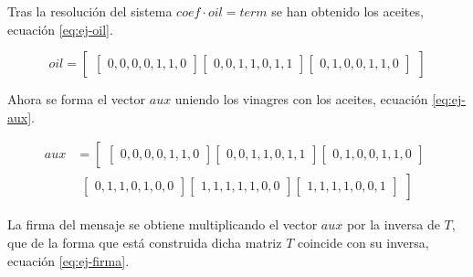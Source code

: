 Tras la resolución del sistema $coef \cdot oil = term$ se han obtenido los aceites, ecuación \ref{eq:ej-oil}.

\begin{equation}\label{eq:ej-oil}
	{oil} = 
		\left[\begin{array}{c}
			\left[\begin{array}{c}0, 0, 0, 0, 1, 1, 0\end{array}\right]			
			\left[\begin{array}{c}0, 0, 1, 1, 0, 1, 1\end{array}\right]
			\left[\begin{array}{c}0, 1, 0, 0, 1, 1, 0\end{array}\right]
		\end{array}\right]
\end{equation}

Ahora se forma el vector $aux$ uniendo los vinagres con los aceites, ecuación \ref{eq:ej-aux}.

\begin{equation}\label{eq:ej-aux}
	\begin{split}
	{aux} &= 
		\left[\begin{array}{c}
			\left[\begin{array}{c}0, 0, 0, 0, 1, 1, 0\end{array}\right]		
			\left[\begin{array}{c}0, 0, 1, 1, 0, 1, 1\end{array}\right]
			\left[\begin{array}{c}0, 1, 0, 0, 1, 1, 0\end{array}\right]\end{array}\right.\\
		&
			\left.\begin{array}{c}\left[\begin{array}{c}0, 1, 1, 0, 1, 0, 0\end{array}\right]
			\left[\begin{array}{c}1, 1, 1, 1, 1, 0, 0\end{array}\right]
			\left[\begin{array}{c}1, 1, 1, 1, 0, 0, 1\end{array}\right]
		\end{array}\right]
	\end{split}
\end{equation}

La firma del mensaje se obtiene multiplicando el vector $aux$ por la inversa de $T$, que de la forma que está construida dicha matriz $T$ coincide con su inversa, ecuación \ref{eq:ej-firma}.

